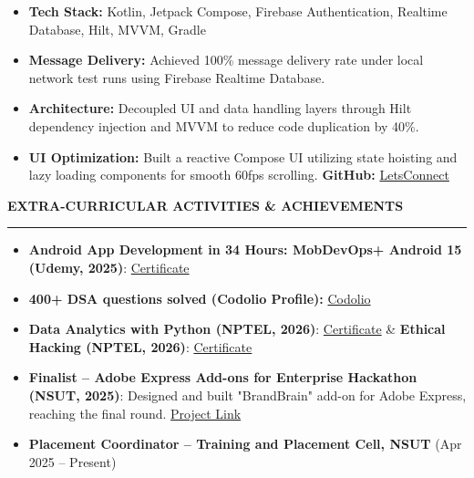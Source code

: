 \documentclass[10pt]{article}
\newcommand{\resheading}[1]{\vspace{6pt} \noindent \textbf{\large\scshape{#1}} \vspace{3pt} \hrule \vspace{4pt}}
\begin{document}
\begin{itemize}
\begin{itemize}[noitemsep]
        \item \textbf{Tech Stack:} Kotlin, Jetpack Compose, Firebase Authentication, Realtime Database, Hilt, MVVM, Gradle
        \item \textbf{Message Delivery:} Achieved 100\% message delivery rate under local network test runs using Firebase Realtime Database.
        \item \textbf{Architecture:} Decoupled UI and data handling layers through Hilt dependency injection and MVVM to reduce code duplication by 40\%.
        \item \textbf{UI Optimization:} Built a reactive Compose UI utilizing state hoisting and lazy loading components for smooth 60fps scrolling. \textbf{GitHub:} \href{https://github.com/DushyantBhardwaj2/ChattingAppNew}{LetsConnect}
    \end{itemize}
\end{itemize}

\resheading{EXTRA-CURRICULAR ACTIVITIES \& ACHIEVEMENTS}
\begin{itemize}
    \item \textbf{Android App Development in 34 Hours: MobDevOps+ Android 15 (Udemy, 2025)}: \href{https://udemy-certificate.s3.amazonaws.com/pdf/UC-332b5f26-9095-4d67-9ffb-956f05e35ffe.pdf}{Certificate}
    \item \textbf{400+ DSA questions solved (Codolio Profile):} \href{https://codolio.com/profile/Negative_Bhardwaj}{Codolio}
    \item \textbf{Data Analytics with Python (NPTEL, 2026)}: \href{https://storage.googleapis.com/2026-mar-halltickets/certificate-generation-apr26/final/regular/noc26-cs86/NOC26CS86S66240572604493783.pdf}{Certificate} \& \textbf{Ethical Hacking (NPTEL, 2026)}: \href{https://archive.nptel.ac.in/content/noc/NOC25/SEM2/Ecertificates/106/noc25-cs142/Course/NPTEL25CS142S106540131810478214.pdf}{Certificate}
    \item \textbf{Finalist -- Adobe Express Add-ons for Enterprise Hackathon (NSUT, 2025)}: Designed and built "BrandBrain" add-on for Adobe Express, reaching the final round. \href{https://devpost.com/software/brandbrain}{Project Link}
    \item \textbf{Placement Coordinator -- Training and Placement Cell, NSUT} (Apr 2025 -- Present)
\end{itemize}
\end{document}
